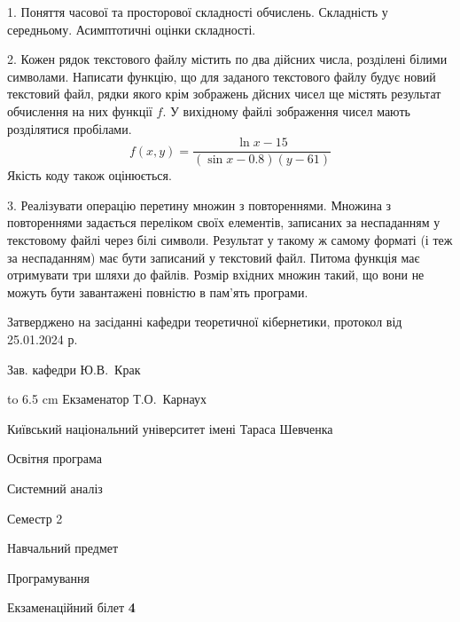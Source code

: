 \documentclass[12pt, ukrainian]{article}
\begin{document}
{%
1. Поняття часової та просторової складності обчислень. Складність у середньому. Асимптотичні оцінки складності.%
\par
\vspace{2mm}

2. Кожен рядок текстового файлу містить по два дійсних числа, розділені білими символами.
Написати функцію, що для заданого текстового файлу будує новий текстовий файл, рядки якого крім зображень дйсних чисел ще містять результат обчислення на них функції $f$. У вихідному файлі зображення чисел мають розділятися пробілами. 
$$f(x, y) =\frac{\ln x - 15}{(\sin x - 0.8) (y - 61)}$$ 
Якість коду також оцінюється.

\par
\vspace{2mm}

3. Реалізувати операцію перетину множин з повтореннями. Множина з повтореннями задається переліком своїх елементів, записаних за неспаданням у текстовому файлі через білі символи. Результат у такому ж самому форматі (і теж за неспаданням) має бути записаний у текстовий файл. Питома функція має отримувати три шляхи до файлів. Розмір вхідних множин такий, що вони не можуть бути завантажені повністю в пам’ять програми.

}
{\smallskip\smallskip \begin {scriptsize} Затверджено на засіданні кафедри теоретичної кібернетики, протокол   від   25.01.2024 р.\par\smallskip\smallskip\smallskip\smallskip
{\parbox {6.5 cm} {Зав. кафедри \dotfill Ю.В.~Крак}}\hspace {0.7cm} {\hbox to 6.5 cm { Екзаменатор \dotfill Т.О.~Карнаух}} \end{scriptsize}}
\vspace{0.9cm}
{{\begin {scriptsize}\par
{ \center  Київський національний університет імені Тараса Шевченка \par}
{\parbox {5 cm}{Освітня програма \hfill}{\parbox {7 cm}{Системний аналіз\hfill}}\parbox {6 cm}{\hfill Семестр 2}}\par
{\parbox {5 cm} {Навчальний предмет \hfill}\parbox {7 cm}{Програмування \hfill}\parbox {6cm}{\hfill}\par}\vspace{-15pt} \end{scriptsize}}{\center Екзаменаційний білет \No \textbf { 4 }\par}}
\end{document}
